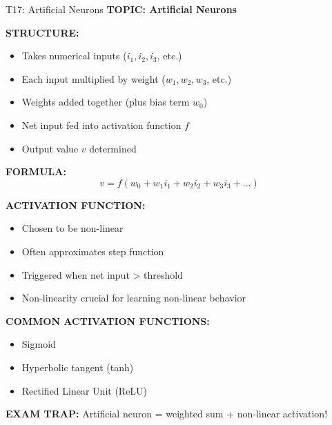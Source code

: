 \documentclass[8pt]{beamer}
\begin{document}
	\begin{frame}{T17: Artificial Neurons}
		\fontsize{6.5}{7.5}\selectfont
		\textbf{TOPIC: Artificial Neurons}
		
		\vspace{0.1cm}
		\textbf{STRUCTURE:}
		\begin{itemize}
			\item Takes numerical inputs ($i_1, i_2, i_3$, etc.)
			\item Each input multiplied by weight ($w_1, w_2, w_3$, etc.)
			\item Weights added together (plus bias term $w_0$)
			\item Net input fed into activation function $f$
			\item Output value $v$ determined
		\end{itemize}
		
		\vspace{0.1cm}
		\textbf{FORMULA:}
		\[
		v = f(w_0 + w_1 i_1 + w_2 i_2 + w_3 i_3 + ...)
		\]
		
		\vspace{0.1cm}
		\textbf{ACTIVATION FUNCTION:}
		\begin{itemize}
			\item Chosen to be non-linear
			\item Often approximates step function
			\item Triggered when net input > threshold
			\item Non-linearity crucial for learning non-linear behavior
		\end{itemize}
		
		\vspace{0.1cm}
		\textbf{COMMON ACTIVATION FUNCTIONS:}
		\begin{itemize}
			\item Sigmoid
			\item Hyperbolic tangent (tanh)
			\item Rectified Linear Unit (ReLU)
		\end{itemize}
		
		\textcolor{myred}{\textbf{EXAM TRAP:}} Artificial neuron = \textcolor{myblue}{weighted sum + non-linear activation}!
	\end{frame}
	
\end{document}
